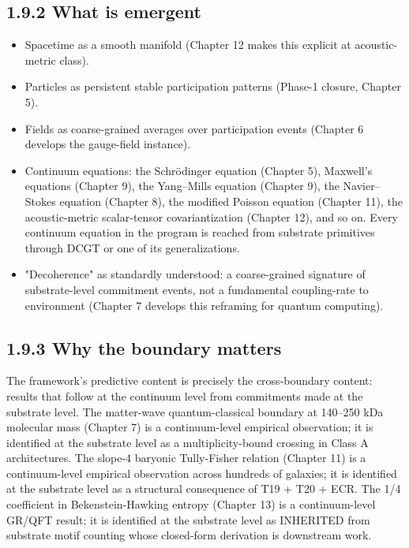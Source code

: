 \documentclass[11pt]{book}
\begin{document}
\subsection{1.9.2 What is emergent}

\begin{itemize}
\item Spacetime as a smooth manifold (Chapter 12 makes this explicit at acoustic-metric class).
\item Particles as persistent stable participation patterns (Phase-1 closure, Chapter 5).
\item Fields as coarse-grained averages over participation events (Chapter 6 develops the gauge-field instance).
\item Continuum equations: the Schrödinger equation (Chapter 5), Maxwell's equations (Chapter 9), the Yang–Mills equation (Chapter 9), the Navier–Stokes equation (Chapter 8), the modified Poisson equation (Chapter 11), the acoustic-metric scalar-tensor covariantization (Chapter 12), and so on. Every continuum equation in the program is reached from substrate primitives through DCGT or one of its generalizations.
\item "Decoherence" as standardly understood: a coarse-grained signature of substrate-level commitment events, not a fundamental coupling-rate to environment (Chapter 7 develops this reframing for quantum computing).
\end{itemize}

\subsection{1.9.3 Why the boundary matters}

The framework's predictive content is precisely the cross-boundary content: results that follow at the continuum level from commitments made at the substrate level. The matter-wave quantum-classical boundary at 140–250 kDa molecular mass (Chapter 7) is a continuum-level empirical observation; it is identified at the substrate level as a multiplicity-bound crossing in Class A architectures. The slope-4 baryonic Tully-Fisher relation (Chapter 11) is a continuum-level empirical observation across hundreds of galaxies; it is identified at the substrate level as a structural consequence of T19 + T20 + ECR. The 1/4 coefficient in Bekenstein-Hawking entropy (Chapter 13) is a continuum-level GR/QFT result; it is identified at the substrate level as INHERITED from substrate motif counting whose closed-form derivation is downstream work.
\end{document}

